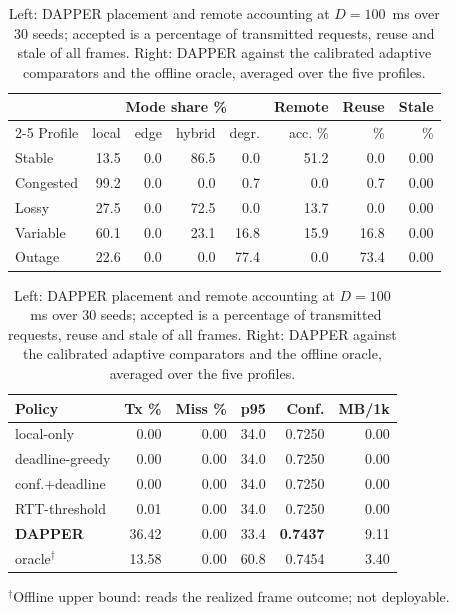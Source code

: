 \documentclass[conference,a4paper]{IEEEtran}
\begin{document}
\begin{table}[t]
\centering
\caption{Left: DAPPER placement and remote accounting at $D=100$~ms over 30 seeds; accepted is a percentage of transmitted requests, reuse and stale of all frames. Right: DAPPER against the calibrated adaptive comparators and the offline oracle, averaged over the five profiles.}
\label{tab:modes}
\scriptsize
\renewcommand{\arraystretch}{0.9}
\begin{minipage}[t]{0.545\textwidth}
\centering
\setlength{\tabcolsep}{3.4pt}
\begin{tabular}{@{}lrrrrrrr@{}}
\toprule
& \multicolumn{4}{c}{Mode share \%} & Remote & Reuse & Stale \\
\cmidrule(lr){2-5}
Profile & local & edge & hybrid & degr. & acc. \% & \% & \% \\
\midrule
Stable & 13.5 & 0.0 & 86.5 & 0.0 & 51.2 & 0.0 & 0.00 \\
Congested & 99.2 & 0.0 & 0.0 & 0.7 & 0.0 & 0.7 & 0.00 \\
Lossy & 27.5 & 0.0 & 72.5 & 0.0 & 13.7 & 0.0 & 0.00 \\
Variable & 60.1 & 0.0 & 23.1 & 16.8 & 15.9 & 16.8 & 0.00 \\
Outage & 22.6 & 0.0 & 0.0 & 77.4 & 0.0 & 73.4 & 0.00 \\
\bottomrule
\end{tabular}
\end{minipage}\hfill
\begin{minipage}[t]{0.435\textwidth}
\centering
\setlength{\tabcolsep}{3.4pt}
\begin{tabular}{@{}lrrrrr@{}}
\toprule
Policy & Tx \% & Miss \% & p95 & Conf. & MB/1k \\
\midrule
local-only & 0.00 & 0.00 & 34.0 & 0.7250 & 0.00 \\
deadline-greedy & 0.00 & 0.00 & 34.0 & 0.7250 & 0.00 \\
conf.+deadline & 0.00 & 0.00 & 34.0 & 0.7250 & 0.00 \\
RTT-threshold & 0.01 & 0.00 & 34.0 & 0.7250 & 0.00 \\
\textbf{DAPPER} & 36.42 & 0.00 & 33.4 & \textbf{0.7437} & 9.11 \\
oracle$^{\dagger}$ & 13.58 & 0.00 & 60.8 & 0.7454 & 3.40 \\
\bottomrule
\end{tabular}

\vspace{2pt}
\begin{flushleft}\scriptsize $^{\dagger}$Offline upper bound: reads the realized frame outcome; not deployable.\end{flushleft}
\end{minipage}
\end{table}
\end{document}

